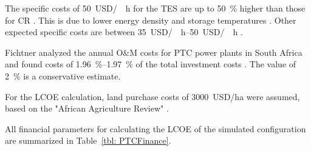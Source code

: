 The specific costs of \SI{50}{USD/\kilo\wattth\hour} for the \ac{TES} are up to \SI{50}{\percent} higher than those for \ac{CR} \cite{Platzer2014}. This is due to lower energy density and storage temperatures \cite{Steinmann2015}. Other expected specific costs are between \SIrange{35}{50}{USD/\kilo\wattth\hour} \cite{Steinmann2012}.

Fichtner analyzed the annual \ac{O&M} costs for \ac{PTC} power plants in South Africa and found costs of \SIrange{1.96}{1.97}{\percent} of the total investment costs \cite{Fichtner2010}. The value of \SI{2}{\percent} is a conservative estimate.


For the \ac{LCOE} calculation, land purchase costs of \SI{3000}{USD/\hectare} were assumed, based on the "African Agriculture Review" \cite{Cassell2012}.


All financial parameters for calculating the \ac{LCOE} of the simulated configuration are summarized in Table~\ref{tbl: PTCFinance}. 

